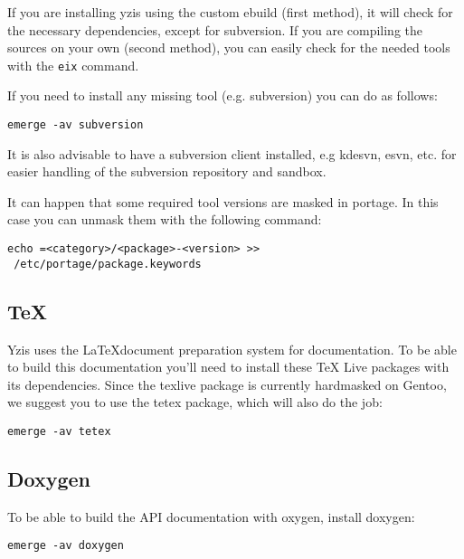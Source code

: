 \documentclass[a4paper,12pt]{report}
\begin{document}
If you are installing yzis using the custom ebuild (first method), it will check for the necessary dependencies, except for subversion. If you are compiling the sources on your own (second method), you can easily check for the needed tools with the \texttt{eix} command.

If you need to install any missing tool (e.g. subversion) you can do as follows:

\texttt{emerge -av subversion}

It is also advisable to have a subversion client installed, e.g kdesvn, esvn, etc. for easier handling of the subversion repository and sandbox.

It can happen that some required tool versions are masked in portage. In this case you can unmask them  with the following command:

\texttt{echo =<category>/<package>-<version> >> \\\
/etc/portage/package.keywords}

\subsection{\TeX}

Yzis uses the \LaTeX document preparation system for documentation. To be able
to build this documentation you'll need to install these \TeX{} Live packages
with its dependencies. Since the texlive package is currently hardmasked on Gentoo, we suggest you to use the tetex package, which will also do the job:

\texttt{emerge -av tetex}

\subsection{Doxygen}
To be able to build the API documentation with oxygen, install doxygen:

\texttt{emerge -av doxygen}
\end{document}
